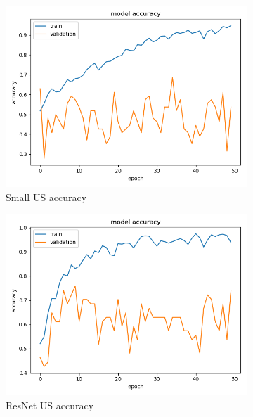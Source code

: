 \begin{figure}[h]
\centering
\begin{subfigure}[b]{.3\linewidth}
\includegraphics[width=\linewidth]{Figs/small_us_acc.jpg}
\caption{Small US accuracy}
\end{subfigure}
\begin{subfigure}[b]{.3\linewidth}
\includegraphics[width=\linewidth]{Figs/resnet_us_acc.jpg}
\caption{ResNet US accuracy}
\end{subfigure}
\begin{subfigure}[b]{.3\linewidth}

\end{subfigure}
\end{figure}

